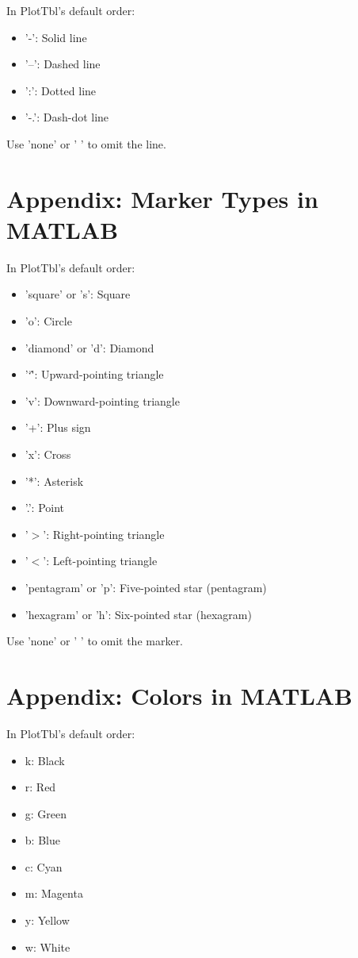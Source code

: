 \documentclass{article}
\newcommand{\caret}{\char`\^}
\begin{document}
In PlotTbl's default order:

\begin{itemize}
\item '-': Solid line
\item '--': Dashed line
\item ':': Dotted line
\item '-.': Dash-dot line
\end{itemize}

Use 'none' or ' ' to omit the line.

\section{Appendix: Marker Types in MATLAB}

In PlotTbl's default order:

\begin{itemize}
\item 'square' or 's': Square
\item 'o': Circle
\item 'diamond' or 'd': Diamond
\item '\caret': Upward-pointing triangle
\item 'v': Downward-pointing triangle
\item '+': Plus sign
\item 'x': Cross
\item '*': Asterisk
\item '.': Point
\item '$>$': Right-pointing triangle
\item '$<$': Left-pointing triangle
\item 'pentagram' or 'p': Five-pointed star (pentagram)
\item 'hexagram' or 'h': Six-pointed star (hexagram)
\end{itemize}

Use 'none' or ' ' to omit the marker.

\section{Appendix: Colors in MATLAB}

In PlotTbl's default order:

\begin{itemize}
\item k: Black
\item r: Red
\item g: Green
\item b: Blue
\item c: Cyan
\item m: Magenta
\item y: Yellow
\item w: White
\end{itemize}
\end{document}
